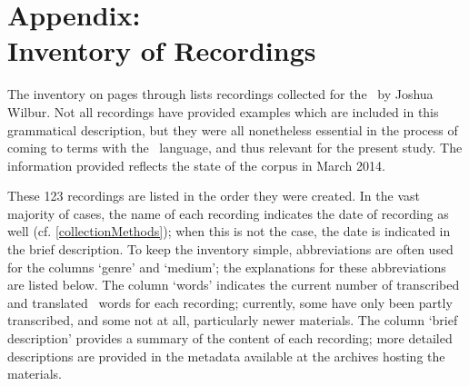 %



\appendix%
\chapter*{Appendix: \\Inventory of Recordings}
\label{inventory}\hypertarget{inventoryRef}{}
The inventory on pages \pageref{inventoryBegin} through \pageref{inventoryEnd} 
lists recordings collected for the \PSDP\ by Joshua Wilbur. Not all recordings have provided examples which are included in this grammatical description, but they were all nonetheless essential in the process of coming to terms with the \PS\ language, and thus relevant for the present study. 
The information provided reflects the state of the corpus in March 2014. 

These 123 recordings are listed in the order they were created. In the vast majority of cases, the name of each recording indicates the date of recording as well (cf. \SEC\ref{collectionMethods}); when this is not the case, the date is indicated in the brief description. To keep the inventory simple, %
abbreviations are often used for the columns ‘genre’ and ‘medium’; %
the explanations for these abbreviations are listed below. %
The column ‘words’ indicates the current number of transcribed and translated \PS\ words for each recording; currently, some have only been partly transcribed, and some not at all, particularly newer materials. 
The column ‘brief description’ provides a summary of the content of each recording; more detailed descriptions are provided in the metadata available at the archives hosting the materials. 

